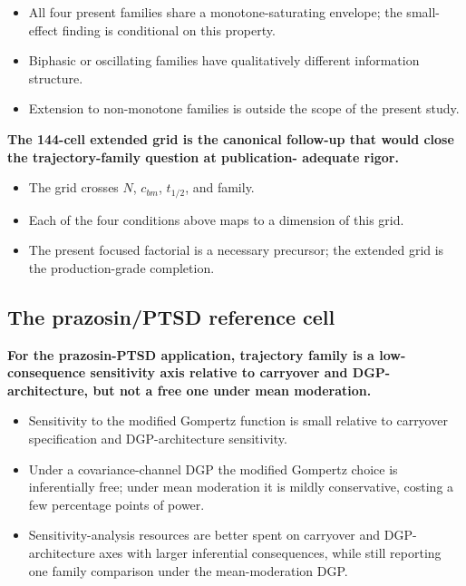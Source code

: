 \documentclass[
  11pt,
]{article}
\begin{document}
\begin{itemize}\setlength{\itemsep}{2pt}\setlength{\parskip}{0pt}
\item All four present families share a monotone-saturating
  envelope; the small-effect finding is conditional on this
  property.
\item Biphasic or oscillating families have qualitatively
  different information structure.
\item Extension to non-monotone families is outside the scope
  of the present study.
\end{itemize}

\textbf{The 144-cell extended grid is the canonical follow-up
that would close the trajectory-family question at publication-
adequate rigor.}

\begin{itemize}\setlength{\itemsep}{2pt}\setlength{\parskip}{0pt}
\item The grid crosses $N$, $c_{bm}$, $t_{1/2}$, and family.
\item Each of the four conditions above maps to a dimension of
  this grid.
\item The present focused factorial is a necessary precursor;
  the extended grid is the production-grade completion.
\end{itemize}

\subsection{The prazosin/PTSD reference cell}\label{the-prazosinptsd-reference-cell}

\textbf{For the prazosin-PTSD application, trajectory family is a
low-consequence sensitivity axis relative to carryover and
DGP-architecture, but not a free one under mean moderation.}

\begin{itemize}\setlength{\itemsep}{2pt}\setlength{\parskip}{0pt}
\item Sensitivity to the modified Gompertz function is small relative
  to carryover specification and DGP-architecture sensitivity.
\item Under a covariance-channel DGP the modified Gompertz choice is
  inferentially free; under mean moderation it is mildly
  conservative, costing a few percentage points of power.
\item Sensitivity-analysis resources are better spent on
  carryover and DGP-architecture axes with larger inferential
  consequences, while still reporting one family comparison
  under the mean-moderation DGP.
\end{itemize}
\end{document}
